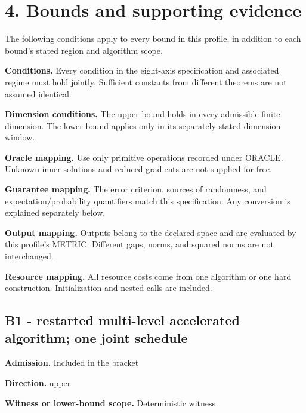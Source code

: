 \documentclass[10pt,a4paper]{article}
\begin{document}
\section{4. Bounds and supporting evidence}


The following conditions apply to every bound in this profile, in addition to each bound's stated region and algorithm scope.



\textbf{Conditions.} Every condition in the eight-axis specification and associated regime must hold jointly. Sufficient constants from different theorems are not assumed identical.



\textbf{Dimension conditions.} The upper bound holds in every admissible finite dimension. The lower bound applies only in its separately stated dimension window.



\textbf{Oracle mapping.} Use only primitive operations recorded under ORACLE. Unknown inner solutions and reduced gradients are not supplied for free.



\textbf{Guarantee mapping.} The error criterion, sources of randomness, and expectation/probability quantifiers match this specification. Any conversion is explained separately below.



\textbf{Output mapping.} Outputs belong to the declared space and are evaluated by this profile's METRIC. Different gaps, norms, and squared norms are not interchanged.



\textbf{Resource mapping.} All resource costs come from one algorithm or one hard construction. Initialization and nested calls are included.



\subsection{B1 - restarted multi-level accelerated algorithm; one joint schedule}


\textbf{Admission.} Included in the bracket



\textbf{Direction.} upper



\textbf{Witness or lower-bound scope.} Deterministic witness
\end{document}
